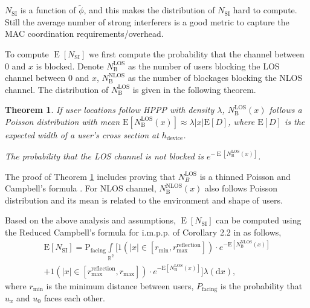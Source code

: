 \documentclass[10pt, conference, letterpaper]{IEEEtran}
\newtheorem{theorem}{Theorem}
\DeclareMathOperator*{\E}{\mathrm{E}}
\DeclareMathOperator*{\LOS}{\mathrm{LOS}}
\DeclareMathOperator*{\NLOS}{\mathrm{NLOS}}
\begin{document}
$N_{\mathrm{SI}}$ is a function of $\tilde{\phi}$, and this makes the distribution of $N_{\mathrm{SI}}$ hard to compute. 
Still the average number of strong interferers is a good metric to capture the MAC coordination requirements/overhead.


To compute $\E[N_{\mathrm{SI}}]$ we first compute the probability that the channel between $0$ and $x$ is blocked. 
Denote $N_{\mathrm{B}}^{\LOS}$ as the number of users blocking the LOS channel between $0$ and $x$, $N_{\mathrm{B}}^{\NLOS}$ as the number of blockages blocking the NLOS channel. 
The distribution of $N_\mathrm{B}^{\LOS}$ is given in the following theorem. 
\begin{theorem}\label{theorem:E_N_B_LOS}
	If user locations follow HPPP with density $\lambda$, $N_\mathrm{B}^\mathrm{LOS}(x)$ follows a Poisson distribution with mean $\mathrm{E}[N_{\mathrm{B}}^\mathrm{LOS}(x)] \approx \lambda |x| \mathrm{E}[D]$, where $\mathrm{E}[D]$ is the expected width of a user's cross section at $h_{\mathrm{device}}$.
	
	The probability that the LOS channel is not blocked is $e^{-\E[N_\mathrm{B}^\mathrm{LOS}(x)]}$.
\end{theorem}

The proof of Theorem \ref{theorem:E_N_B_LOS} includes proving that $N_B^{\LOS}$ is a thinned Poisson \cite{poisson} and Campbell's formula \cite{stochasticgeometry}.
For NLOS channel, $N_{\mathrm{B}}^\mathrm{NLOS}(x)$ also follows Poisson distribution and its mean is related to the environment and shape of users. 




Based on the above analysis and assumptions, $\E[N_{\mathrm{SI}}]$ can be computed using the Reduced Campbell's formula for i.m.p.p. of Corollary 2.2 in \cite{stochasticgeometry} as follows,
\begin{multline}\label{eq:E_N_SI}
\mathrm{E}[N_{\mathrm{SI}}] =  \mathrm{P}_{\text{facing}} \int\limits_{\mathbb{R}^2} 
 \big[\text{1}(|x|\in[r_{\min},r_{\text{max}}^{\mathrm{reflection}}])
\cdot e^{-\mathrm{E}[N_{\mathrm{B}}^\mathrm{NLOS}(x)]} \\
+ \text{1}(|x|\in[r_{\text{max}}^{\mathrm{reflection}},r_{\text{max}}])
\cdot e^{-\mathrm{E}[N_{\mathrm{B}}^\mathrm{LOS}(x)]} \big]\lambda(\mathrm{d}x),
\end{multline}
where $r_{\min}$ is the minimum distance between users, $P_{\text{facing}}$ is the probability that $u_x$ and $u_0$ faces each other.
\end{document}
